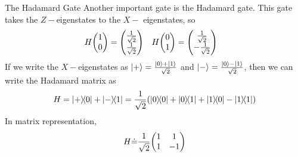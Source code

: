 \documentclass{beamer}
\begin{document}
\begin{frame}{The Hadamard Gate}
Another important gate is the Hadamard gate. This gate takes the $Z-$eigenstates to the $X-$ eigenstates, so
\begin{align*}
H\mqty(1 \\ 0) &= \mqty(\frac{1}{\sqrt{2}} \\ \frac{1}{\sqrt{2}}) & H\mqty(0 \\ 1) &= \mqty(\frac{1}{\sqrt{2}} \\ -\frac{1}{\sqrt{2}})
\end{align*}
If we write the $X-$eigenstates as $\ket{+} = \frac{\ket{0}+\ket{1}}{\sqrt{2}}$ and $\ket{-} = \frac{\ket 0-\ket{1}}{\sqrt{2}}$, then we can write the Hadamard matrix as
$$
H = \ketbra{+}{0}+\ketbra{-}{1} = \frac{1}{\sqrt{2}}\qty(\ketbra{0}{0}+\ketbra{0}{1}+\ketbra{1}{0}-\ketbra{1}{1})
$$
In matrix representation,
$$
H \dot = \frac{1}{\sqrt{2}}\mqty(1 & 1 \\ 1 & -1)
$$
\end{frame}
\end{document}
